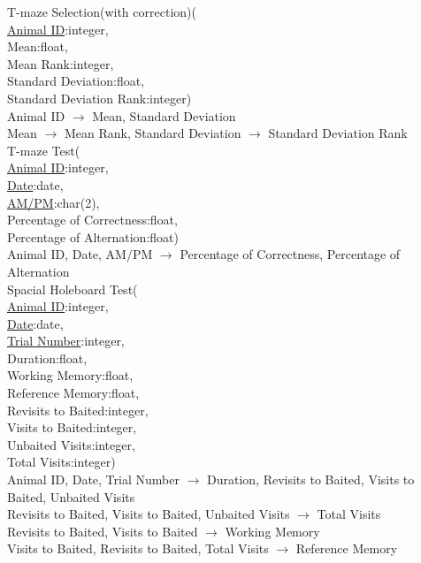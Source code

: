 \documentclass[12pt]{article}
\begin{document}
	\indent T-maze Selection(with correction)(\\
	\indent\indent \underline{Animal ID}:integer,\\
	\indent\indent Mean:float,\\
	\indent\indent Mean Rank:integer,\\
	\indent\indent Standard Deviation:float,\\
	\indent\indent Standard Deviation Rank:integer)\\
	\indent Animal ID $\rightarrow$ Mean, Standard Deviation\\
	\indent Mean $\rightarrow$ Mean Rank, Standard Deviation $\rightarrow$ Standard Deviation Rank\\ 
		
	\indent T-maze Test(\\
	\indent\indent \underline{Animal ID}:integer,\\
	\indent\indent \underline{Date}:date,\\
	\indent\indent \underline{AM/PM}:char(2),\\
	\indent\indent Percentage of Correctness:float,\\
	\indent\indent Percentage of Alternation:float)\\
	\indent Animal ID, Date, AM/PM $\rightarrow$ Percentage of Correctness, Percentage of Alternation\\
	
	\indent Spacial Holeboard Test(\\
	\indent\indent \underline{Animal ID}:integer,\\
	\indent\indent \underline{Date}:date,\\
	\indent\indent \underline{Trial Number}:integer,\\
	\indent\indent Duration:float,\\
	\indent\indent Working Memory:float,\\
	\indent\indent Reference Memory:float,\\
	\indent\indent Revisits to Baited:integer,\\
	\indent\indent Visits to Baited:integer,\\
	\indent\indent Unbaited Visits:integer,\\
	\indent\indent Total Visits:integer)\\
	\indent Animal ID, Date, Trial Number $\rightarrow$ Duration, Revisits to Baited, Visits to Baited, Unbaited Visits\\
	\indent Revisits to Baited, Visits to Baited, Unbaited Visits $\rightarrow$ Total Visits\\
	\indent Revisits to Baited, Visits to Baited $\rightarrow$ Working Memory\\
	\indent Visits to Baited, Revisits to Baited, Total Visits $\rightarrow$ Reference Memory\\
		
\end{document}
